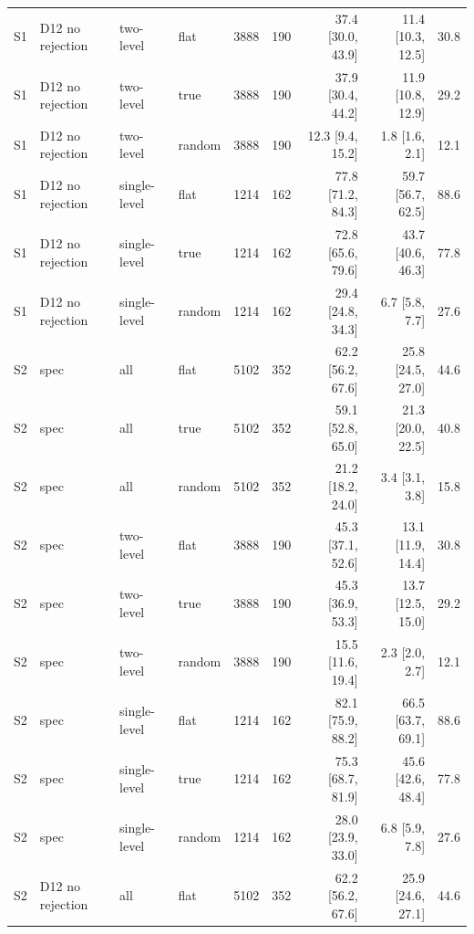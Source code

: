\begin{tabular}{llllrrrrr}
S1 & D12 no rejection & two-level & flat & 3888 & 190 & 37.4 \scriptsize{[30.0, 43.9]} & 11.4 \scriptsize{[10.3, 12.5]} & 30.8 \\
S1 & D12 no rejection & two-level & true & 3888 & 190 & 37.9 \scriptsize{[30.4, 44.2]} & 11.9 \scriptsize{[10.8, 12.9]} & 29.2 \\
S1 & D12 no rejection & two-level & random & 3888 & 190 & 12.3 \scriptsize{[9.4, 15.2]} & 1.8 \scriptsize{[1.6, 2.1]} & 12.1 \\
S1 & D12 no rejection & single-level & flat & 1214 & 162 & 77.8 \scriptsize{[71.2, 84.3]} & 59.7 \scriptsize{[56.7, 62.5]} & 88.6 \\
S1 & D12 no rejection & single-level & true & 1214 & 162 & 72.8 \scriptsize{[65.6, 79.6]} & 43.7 \scriptsize{[40.6, 46.3]} & 77.8 \\
S1 & D12 no rejection & single-level & random & 1214 & 162 & 29.4 \scriptsize{[24.8, 34.3]} & 6.7 \scriptsize{[5.8, 7.7]} & 27.6 \\
\midrule
S2 & spec & all & flat & 5102 & 352 & 62.2 \scriptsize{[56.2, 67.6]} & 25.8 \scriptsize{[24.5, 27.0]} & 44.6 \\
S2 & spec & all & true & 5102 & 352 & 59.1 \scriptsize{[52.8, 65.0]} & 21.3 \scriptsize{[20.0, 22.5]} & 40.8 \\
S2 & spec & all & random & 5102 & 352 & 21.2 \scriptsize{[18.2, 24.0]} & 3.4 \scriptsize{[3.1, 3.8]} & 15.8 \\
S2 & spec & two-level & flat & 3888 & 190 & 45.3 \scriptsize{[37.1, 52.6]} & 13.1 \scriptsize{[11.9, 14.4]} & 30.8 \\
S2 & spec & two-level & true & 3888 & 190 & 45.3 \scriptsize{[36.9, 53.3]} & 13.7 \scriptsize{[12.5, 15.0]} & 29.2 \\
S2 & spec & two-level & random & 3888 & 190 & 15.5 \scriptsize{[11.6, 19.4]} & 2.3 \scriptsize{[2.0, 2.7]} & 12.1 \\
S2 & spec & single-level & flat & 1214 & 162 & 82.1 \scriptsize{[75.9, 88.2]} & 66.5 \scriptsize{[63.7, 69.1]} & 88.6 \\
S2 & spec & single-level & true & 1214 & 162 & 75.3 \scriptsize{[68.7, 81.9]} & 45.6 \scriptsize{[42.6, 48.4]} & 77.8 \\
S2 & spec & single-level & random & 1214 & 162 & 28.0 \scriptsize{[23.9, 33.0]} & 6.8 \scriptsize{[5.9, 7.8]} & 27.6 \\
\midrule
S2 & D12 no rejection & all & flat & 5102 & 352 & 62.2 \scriptsize{[56.2, 67.6]} & 25.9 \scriptsize{[24.6, 27.1]} & 44.6 \\

\end{tabular}
